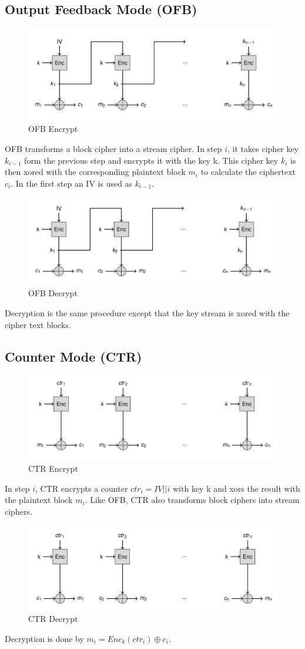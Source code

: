 \subsection{Output Feedback Mode (OFB)}
\begin{figure}[H]
  \centering
  \includegraphics[width=.8\textwidth]{figures/ofb_encrypt.png}
  \caption{OFB Encrypt}
\end{figure}
OFB transforms a block cipher into a stream cipher.
In step $i$, it takes cipher key $k_{i-1}$ form the previous step and encrypts it with the key k.
This cipher key $k_i$ is then xored with the corresponding plaintext block $m_i$ to calculate the ciphertext $c_i$.
In the first step an IV is used as $k_{i-1}$.

\begin{figure}[H]
  \centering
  \includegraphics[width=.8\textwidth]{figures/ofb_decrypt}
  \caption{OFB Decrypt}
\end{figure}
Decryption is the same procedure except that the key stream is xored with the cipher text blocks.
\newpage

\subsection{Counter Mode (CTR)}
\begin{figure}[H]
  \centering
  \includegraphics[width=.8\textwidth]{figures/ctr_encrypt}
  \caption{CTR Encrypt}
\end{figure}
In step $i$, CTR encrypts a counter $ctr_i = IV || i$ with key k and xors the result with the plaintext block $m_i$.
Like OFB, CTR also transforms block ciphers into stream ciphers.

\begin{figure}[H]
  \centering
  \includegraphics[width=.8\textwidth]{figures/ctr_decrypt.png}
  \caption{CTR Decrypt}
\end{figure}
Decryption is done by $m_i = Enc_k(ctr_i) \oplus c_i$.
